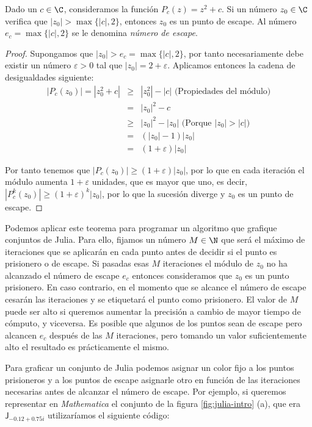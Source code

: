 \begin{teorema}
\label{th:escape}
  Dado un $c\in\C$, consideramos la función $P_c(z)=z^2+c$. Si un número $z_0\in\C$ verifica que $|z_0|>\max\{|c|,2\}$, entonces $z_0$ es un punto de escape. Al número $e_c=\max\{|c|,2\}$ se le denomina \textit{número de escape}.
\end{teorema}
\begin{proof}
  Supongamos que $|z_0|>e_c=\max\{|c|,2\}$, por tanto necesariamente debe existir un número $\varepsilon>0$ tal que $|z_0| = 2 + \varepsilon$. Aplicamos entonces la cadena de desigualdades siguiente:
  \begin{eqnarray*}
    |P_c(z_0)| = |z_0^2 + c| & \geq & |z_0^2| - |c|\text{  (Propiedades del módulo)} \\
    & = & |z_0|^2 - c \\
    & \geq & |z_0|^2 - |z_0|\text{  (Porque } |z_0|>|c| \text{)} \\
    & = & (|z_0|-1)|z_0| \\
    & = & (1 + \varepsilon)|z_0|
  \end{eqnarray*}

  Por tanto tenemos que $|P_c(z_0)|\geq(1 + \varepsilon)|z_0|$, por lo que en cada iteración el módulo aumenta $1+\varepsilon$ unidades, que es mayor que uno, es decir, $|P_c^k(z_0)|\geq(1+\varepsilon)^k|z_0|$, por lo que la sucesión diverge y $z_0$ es un punto de escape. 
\end{proof}

Podemos aplicar este teorema para programar un algoritmo que grafique conjuntos de Julia. Para ello, fijamos un número $M\in\N$ que será el máximo de iteraciones que se aplicarán en cada punto antes de decidir si el punto es prisionero o de escape. Si pasadas esas $M$ iteraciones el módulo de $z_0$ no ha alcanzado el número de escape $e_c$ entonces consideramos que $z_0$ es un punto prisionero. En caso contrario, en el momento que se alcance el número de escape cesarán las iteraciones y se etiquetará el punto como prisionero. El valor de $M$ puede ser alto si queremos aumentar la precisión a cambio de mayor tiempo de cómputo, y viceversa. Es posible que algunos de los puntos sean de escape pero alcancen $e_c$ después de las $M$ iteraciones, pero tomando un valor suficientemente alto el resultado es prácticamente el mismo.

Para graficar un conjunto de Julia podemos asignar un color fijo a los puntos prisioneros y a los puntos de escape asignarle otro en función de las iteraciones necesarias antes de alcanzar el número de escape. Por ejemplo, si queremos representar en \textit{Mathematica} el conjunto de la figura \ref{fig:julia-intro} (a), que era $\mathsf{J}_{-0.12+0.75i}$ utilizaríamos el siguiente código:

